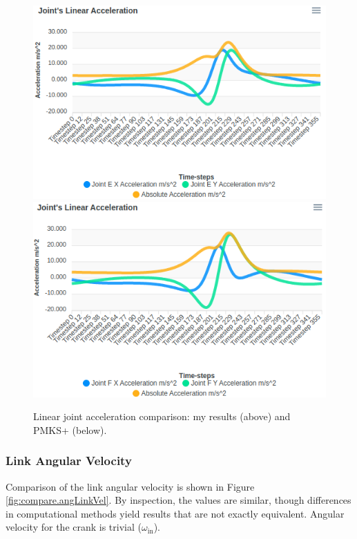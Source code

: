 \documentclass[12pt]{article}
\begin{document}
\begin{figure}[ht]
  \includegraphics[scale=0.45]{../pmks-plots/linJointAcc/linJointAccE.png}%
  \includegraphics[scale=0.45]{../pmks-plots/linJointAcc/linJointAccF.png}%
  \caption{\label{fig:compare.linJointAcc}Linear joint acceleration comparison: my results (above) and PMKS+ (below).}
\end{figure}

\subsubsection{Link Angular Velocity}%
\label{res.compare.angLinkVel}

Comparison of the link angular velocity is shown in Figure \ref{fig:compare.angLinkVel}. By inspection, the values are similar, though differences in computational methods yield results that are not exactly equivalent. Angular velocity for the crank is trivial ($\omega_{\text{in}}$).
\end{document}
